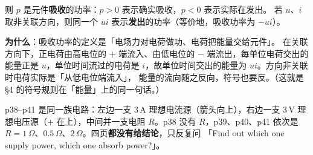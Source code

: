 \documentclass[11pt]{ctexart}
\begin{document}
则 $p$ 是元件\textbf{吸收}的功率：$p>0$ 表示确实吸收，$p<0$ 表示实际在发出。
若 $u$、$i$ 取非关联方向，则同一个 $ui$ 表示\textbf{发出}的功率（等价地，吸收功率为 $-ui$）。

\textbf{为什么}：吸收功率的定义是「电场力对电荷做功、电荷把能量交给元件」。
在关联方向下，正电荷由高电位的 $+$ 端流入、由低电位的 $-$ 端流出，每单位电荷交出的能量正是
$u$，单位时间流过的电荷是 $i$，故单位时间交出的能量为 $ui$。方向非关联时电荷实际是「从低电位端流入」，
能量的流向随之反向，符号也要反。（这就是 §4 的符号规则在「能量」上的同一句话。）



p38--p41 是同一族电路：左边一支 $3\,\mathrm{A}$ 理想电流源（箭头向上），右边一支 $3\,\mathrm{V}$
理想电压源（$+$ 在上），中间并一支电阻 $R$。p38 没有 $R$，p39、p40、p41 依次是
$R=1\,\Omega$、$0.5\,\Omega$、$2\,\Omega$。四页\textbf{都没有给结论}，只反复问
「Find out which one supply power, which one absorb power?」。
\end{document}
